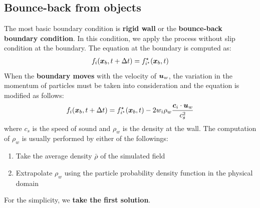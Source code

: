 \subsection{Bounce-back from objects}
The most basic boundary condition is 
{\bf rigid wall} or the {\bf bounce-back boundary condition}.
In this condition, we apply the process without
slip condition at the boundary.
The equation at the boundary is computed as\cite{succi2018lattice}:
\begin{equation}
\begin{aligned}
  f_i(\boldsymbol{x}_b, t + \Delta t) = f_{i^\star}^\star(\boldsymbol{x}_b, t)
\end{aligned}
\label{discretized-rigid-wall}
\end{equation}
When the {\bf boundary moves} with the velocity of
$\boldsymbol{u}_w$, the variation in the momentum of particles
must be taken into consideration and the equation is
modified as follows\cite{succi2018lattice}:
\begin{equation}
  \begin{aligned}
    f_i(\boldsymbol{x}_b, t + \Delta t) = f_{i^\star}^\star (\boldsymbol{x}_b, t) - 
    2 w_i \rho_w \frac{
      \boldsymbol{c}_i \cdot \boldsymbol{u}_w
    }{c_s^2}
  \end{aligned}
  \label{discretized-moving-wall}
\end{equation}
where $c_s$ is the speed of sound and 
$\rho_w$ is the density at the wall.
The computation of $\rho_w$ is usually performed by
either of the followings\cite{zou1997pressure, khajepor2019study}:
\begin{enumerate}
  \item Take the average density $\bar{\rho}$ of the simulated field
  \item Extrapolate $\rho_w$ using 
  the particle probability density function in the physical domain
\end{enumerate}
For the simplicity, we {\bf take the first solution}.

